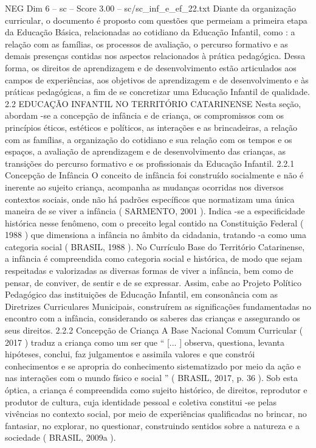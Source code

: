 \begin{textsample}{NEG Dim 6 – sc – Score 3.00 – sc/sc\_inf\_e\_ef\_22.txt}
Diante da organização curricular, o documento é proposto com questões que permeiam a primeira etapa da Educação Básica, relacionadas ao cotidiano da Educação Infantil, como : a relação com as famílias, os processos de avaliação, o percurso formativo e as demais presenças contidas nos aspectos relacionados à prática pedagógica.
Dessa forma, os direitos de aprendizagem e de desenvolvimento estão articulados aos campos de experiências, aos objetivos de aprendizagem e de desenvolvimento e às práticas pedagógicas, a fim de se concretizar uma Educação Infantil de qualidade. 2.2 EDUCAÇÃO INFANTIL NO TERRITÓRIO CATARINENSE Nesta seção, abordam -se a concepção de infância e de criança, os compromissos com os princípios éticos, estéticos e políticos, as interações e as brincadeiras, a relação com as famílias, a organização do cotidiano e sua relação com os tempos e os espaços, a avaliação de aprendizagem e de desenvolvimento das crianças, as transições do percurso formativo e os profissionais da Educação Infantil. 2.2.1 Concepção de Infância O conceito de infância foi construído socialmente e não é inerente ao sujeito criança, acompanha as mudanças ocorridas nos diversos contextos sociais, onde não há padrões específicos que normatizam uma única maneira de se viver a infância ( SARMENTO, 2001 ).
Indica -se a especificidade histórica nesse fenômeno, com o preceito legal contido na Constituição Federal ( 1988 ) que dimensiona a infância no âmbito da cidadania, tratando -a como uma categoria social ( BRASIL, 1988 ).
No Currículo Base do Território Catarinense, a infância é compreendida como categoria social e histórica, de modo que sejam respeitadas e valorizadas as diversas formas de viver a infância, bem como de pensar, de conviver, de sentir e de se expressar.
Assim, cabe ao Projeto Político Pedagógico das instituições de Educação Infantil, em consonância com as Diretrizes Curriculares Municipais, construírem as significações fundamentadas no encontro com a infância, considerando os saberes das crianças e assegurando os seus direitos. 2.2.2 Concepção de Criança A Base Nacional Comum Curricular ( 2017 ) traduz a criança como um ser que “ [... ] observa, questiona, levanta hipóteses, conclui, faz julgamentos e assimila valores e que constrói conhecimentos e se apropria do conhecimento sistematizado por meio da ação e nas interações com o mundo físico e social ” ( BRASIL, 2017, p. 36 ).
Sob esta óptica, a criança é compreendida como sujeito histórico, de direitos, reprodutor e produtor de cultura, cuja identidade pessoal e coletiva constitui -se pelas vivências no contexto social, por meio de experiências qualificadas no brincar, no fantasiar, no explorar, no questionar, construindo sentidos sobre a natureza e a sociedade ( BRASIL, 2009a ).

\end{textsample}
